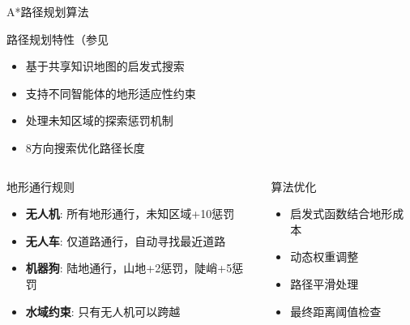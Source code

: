 \documentclass[
10pt,
aspectratio=169,
]{beamer}
\begin{document}
\begin{frame}{A*路径规划算法}
    \begin{block}{路径规划特性（参见}%
        \begin{itemize}
            \item 基于共享知识地图的启发式搜索
            \item 支持不同智能体的地形适应性约束
            \item 处理未知区域的探索惩罚机制
            \item 8方向搜索优化路径长度
        \end{itemize}
    \end{block}
    
    \begin{columns}
        \begin{column}{0.6\textwidth}
            \begin{exampleblock}{地形通行规则}
                \begin{itemize}
                    \item \textbf{无人机}: 所有地形通行，未知区域+10惩罚
                    \item \textbf{无人车}: 仅道路通行，自动寻找最近道路
                    \item \textbf{机器狗}: 陆地通行，山地+2惩罚，陡峭+5惩罚
                    \item \textbf{水域约束}: 只有无人机可以跨越
                \end{itemize}
            \end{exampleblock}
        \end{column}
        \begin{column}{0.4\textwidth}
            \begin{alertblock}{算法优化}
                \begin{itemize}
                    \item 启发式函数结合地形成本
                    \item 动态权重调整
                    \item 路径平滑处理
                    \item 最终距离阈值检查
                \end{itemize}
            \end{alertblock}
        \end{column}
    \end{columns}
\end{frame}

\end{document}
